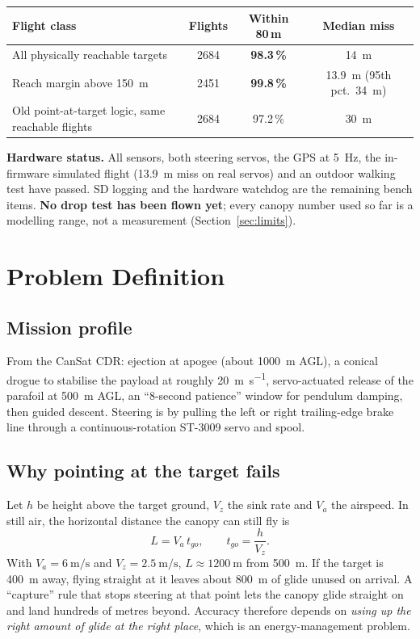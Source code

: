 \documentclass[11pt,a4paper]{article}
\newcommand{\good}[1]{\textcolor{goodgreen}{\textbf{#1}}}
\begin{document}
\begin{center}
\renewcommand{\arraystretch}{1.25}
\begin{tabular}{lccc}
\toprule
\textbf{Flight class} & \textbf{Flights} & \textbf{Within 80\,m} & \textbf{Median miss} \\
\midrule
All physically reachable targets & 2684 & \good{98.3\,\%} & \SI{14}{\meter} \\
Reach margin above \SI{150}{\meter} & 2451 & \good{99.8\,\%} & \SI{13.9}{\meter} (95th pct.\ \SI{34}{\meter}) \\
Old point-at-target logic, same reachable flights & 2684 & 97.2\,\% & \SI{30}{\meter} \\
\bottomrule
\end{tabular}
\end{center}

\noindent\textbf{Hardware status.} All sensors, both steering servos, the
GPS at \SI{5}{\hertz}, the in-firmware simulated flight (\SI{13.9}{\meter}
miss on real servos) and an outdoor walking test have passed. SD logging and
the hardware watchdog are the remaining bench items. \textbf{No drop test
has been flown yet}; every canopy number used so far is a modelling range,
not a measurement (Section~\ref{sec:limits}).

\section{Problem Definition}

\subsection{Mission profile}
From the CanSat CDR: ejection at apogee (about \SI{1000}{\meter} AGL), a
conical drogue to stabilise the payload at roughly \SI{20}{\meter\per\second},
servo-actuated release of the parafoil at \SI{500}{\meter} AGL, an
``8-second patience'' window for pendulum damping, then guided descent.
Steering is by pulling the left or right trailing-edge brake line through a
continuous-rotation ST-3009 servo and spool.

\subsection{Why pointing at the target fails}
Let $h$ be height above the target ground, $V_z$ the sink rate and $V_a$ the
airspeed. In still air, the horizontal distance the canopy can still fly is
\begin{equation}
  L = V_a\, t_{go}, \qquad t_{go} = \frac{h}{V_z}.
\end{equation}
With $V_a = \SI{6}{\meter\per\second}$ and $V_z = \SI{2.5}{\meter\per\second}$,
$L \approx \SI{1200}{\meter}$ from \SI{500}{\meter}. If the target is
\SI{400}{\meter} away, flying straight at it leaves about \SI{800}{\meter}
of glide unused on arrival. A ``capture'' rule that stops steering at that
point lets the canopy glide straight on and land hundreds of metres beyond.
Accuracy therefore depends on \emph{using up the right amount of glide at the
right place}, which is an energy-management problem.
\end{document}
